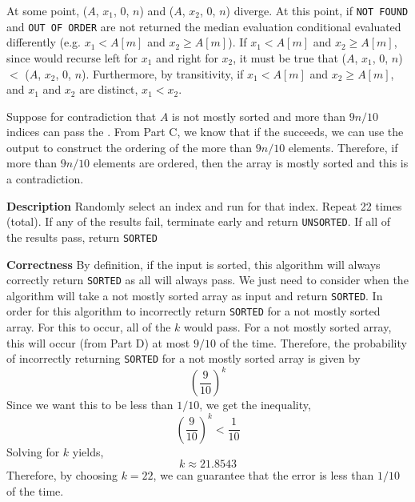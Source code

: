 \documentclass[12pt,twoside]{article}
\begin{document}
\begin{problems}
\begin{problemparts}
\problempart %

At some point, ($A$, $x_1$, $0$, $n$) and ($A$, $x_2$, $0$, $n$) diverge. At this point, if {\tt NOT
FOUND} and {\tt OUT OF ORDER} are not returned the median evaluation
conditional evaluated differently (e.g. $x_1 < A[m]$ and $x_2 \geq A[m]$).
If $x_1 < A[m]$ and $x_2 \geq A[m]$, since  would
recurse left for $x_1$ and right for $x_2$, it must be true that ($A$, $x_1$, $0$, $n$) $<$ ($A$, $x_2$,
$0$, $n$). Furthermore, by transitivity, if $x_1 < A[m]$ and $x_2 \geq A[m]$,
and $x_1$ and $x_2$ are distinct, $x_1 < x_2$.

\problempart %

Suppose for contradiction that $A$ is not mostly sorted and more than $9n/10$
indices can pass the . From Part C, we know that
if the  succeeds, we can use the output to construct
the ordering of the more than $9n/10$ elements. Therefore, if more than
$9n/10$ elements are ordered, then the array is mostly sorted and this is a
contradiction.

\problempart %

{\bf Description} Randomly select an index and run 
for that index. Repeat 22 times (total). If any of the results fail,
terminate early and return {\tt UNSORTED}. If all of the results pass, return
{\tt SORTED}

{\bf Correctness} By definition, if the input is sorted, this algorithm will
always correctly return {\tt SORTED} as all  will 
always pass. We just need to consider when the algorithm will take a not
mostly sorted array as input and return {\tt SORTED}. In order for this
algorithm to incorrectly return {\tt SORTED} for a not mostly sorted array.
For this to occur, all of the $k$  would pass. For
a not mostly sorted array, this will occur (from Part D) at most $9/10$ of
the time. Therefore, the probability of incorrectly returning {\tt SORTED}
for a not mostly sorted array is given by
$$ \left(\frac{9}{10}\right)^k $$
Since we want this to be less than $1/10$, we get the inequality,
$$ \left(\frac{9}{10}\right)^k < \frac{1}{10} $$
Solving for $k$ yields,
$$ k \approx 21.8543 $$
Therefore, by choosing $k = 22$, we can guarantee that the error is less than
$1/10$ of the time.


\end{problemparts}
\end{problems}
\end{document}

